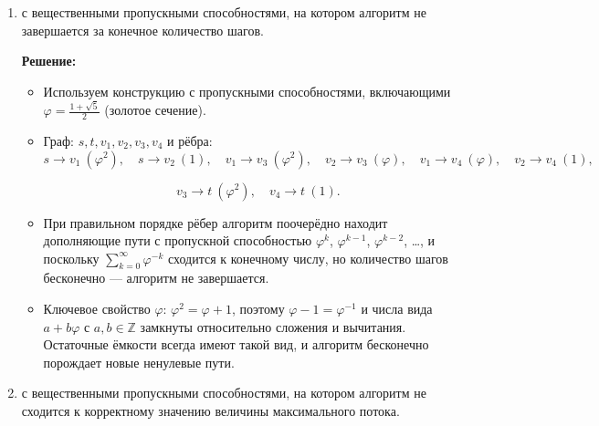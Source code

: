 \begin{enumerate}
\begin{enumerate}
\begin{itemize}
          \item После насыщения ребра $a_i \to b_i$ алгоритм начинает использовать пути $s \to a_j \to b_i \to t$ (через обратные рёбра), что имитирует двоичный счётчик: каждая единица в $i$-м разряде «сбрасывается», когда соответствующий счётчик переполняется.

          \item Суммарное число итераций --- $2^k - 1$, что экспоненциально от $V = 2k+2$.
          Суммарная длина пропускных способностей: $\sum_{i=1}^k 2^{i-1} = 2^k - 1$ --- полиномиальная длина (записывается $k$ битами).
        \end{itemize}

      \item
        с вещественными пропускными способностями, на котором алгоритм не завершается за конечное количество шагов.

        \textbf{Решение:}

        \begin{itemize}
          \item Используем конструкцию с пропускными способностями, включающими $\varphi = \frac{1+\sqrt{5}}{2}$ (золотое сечение).

          \item Граф: $s, t, v_1, v_2, v_3, v_4$ и рёбра:
          $$s \to v_1\ (\varphi^2),\quad s \to v_2\ (1),\quad v_1 \to v_3\ (\varphi^2),\quad v_2 \to v_3\ (\varphi),\quad v_1 \to v_4\ (\varphi),\quad v_2 \to v_4\ (1), $$
          
          $$\quad v_3 \to t\ (\varphi^2),\quad v_4 \to t\ (1).$$

          \item При правильном порядке рёбер алгоритм поочерёдно находит дополняющие пути с пропускной способностью $\varphi^k$, $\varphi^{k-1}$, $\varphi^{k-2}$, \ldots, и поскольку $\sum_{k=0}^{\infty} \varphi^{-k}$ сходится к конечному числу, но количество шагов бесконечно --- алгоритм не завершается.

          \item Ключевое свойство $\varphi$: $\varphi^2 = \varphi + 1$, поэтому $\varphi - 1 = \varphi^{-1}$ и числа вида $a + b\varphi$ с $a, b \in \mathbb{Z}$ замкнуты относительно сложения и вычитания. Остаточные ёмкости всегда имеют такой вид, и алгоритм бесконечно порождает новые ненулевые пути.
        \end{itemize}

      \item
        с вещественными пропускными способностями, на котором алгоритм не сходится к корректному значению
        величины максимального потока.


\end{enumerate}
\end{enumerate}

